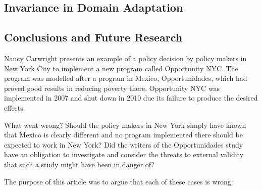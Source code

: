 \documentclass[a4paper,12pt]{article}
\begin{document}
\subsection*{Invariance in Domain Adaptation}






\subsection*{Conclusions and Future Research}





Nancy Carwright \parencite*{Cartwright2016} presents an example of a policy decision by policy makers in New York City to implement a new program called Opportunity NYC. The program was modelled after a program in Mexico, Opportunidades, which had proved good results in reducing poverty there. Opportunity NYC was implemented in 2007 and shut down in 2010 due its failure to produce the desired effects. 

What went wrong? Should the policy makers in New York simply have known that Mexico is clearly different and no program implemented there should be expected to work in New York? Did the writers of the Opportunidades study have an obligation to investigate and consider the threats to external validity that such a study might have been in danger of? 

The purpose of this article was to argue that each of these cases is wrong: 
\end{document}
